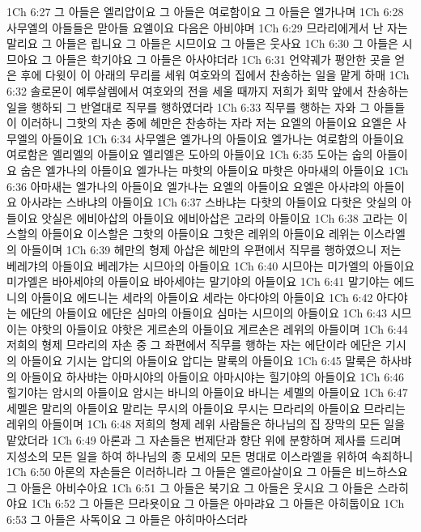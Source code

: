 1Ch 6:27  그 아들은 엘리압이요 그 아들은 여로함이요 그 아들은 엘가나며
1Ch 6:28  사무엘의 아들들은 맏아들 요엘이요 다음은 아비야며
1Ch 6:29  므라리에게서 난 자는 말리요 그 아들은 립니요 그 아들은 시므이요 그 아들은 웃사요
1Ch 6:30  그 아들은 시므아요 그 아들은 학기야요 그 아들은 아사야더라
1Ch 6:31  언약궤가 평안한 곳을 얻은 후에 다윗이 이 아래의 무리를 세워 여호와의 집에서 찬송하는 일을 맡게 하매
1Ch 6:32  솔로몬이 예루살렘에서 여호와의 전을 세울 때까지 저희가 회막 앞에서 찬송하는 일을 행하되 그 반열대로 직무를 행하였더라
1Ch 6:33  직무를 행하는 자와 그 아들들이 이러하니 그핫의 자손 중에 헤만은 찬송하는 자라 저는 요엘의 아들이요 요엘은 사무엘의 아들이요
1Ch 6:34  사무엘은 엘가나의 아들이요 엘가나는 여로함의 아들이요 여로함은 엘리엘의 아들이요 엘리엘은 도아의 아들이요
1Ch 6:35  도아는 숩의 아들이요 숩은 엘가나의 아들이요 엘가나는 마핫의 아들이요 마핫은 아마새의 아들이요
1Ch 6:36  아마새는 엘가나의 아들이요 엘가나는 요엘의 아들이요 요엘은 아사랴의 아들이요 아사랴는 스바냐의 아들이요
1Ch 6:37  스바냐는 다핫의 아들이요 다핫은 앗실의 아들이요 앗실은 에비아삽의 아들이요 에비아삽은 고라의 아들이요
1Ch 6:38  고라는 이스할의 아들이요 이스할은 그핫의 아들이요 그핫은 레위의 아들이요 레위는 이스라엘의 아들이며
1Ch 6:39  헤만의 형제 아삽은 헤만의 우편에서 직무를 행하였으니 저는 베레갸의 아들이요 베레갸는 시므아의 아들이요
1Ch 6:40  시므아는 미가엘의 아들이요 미가엘은 바아세야의 아들이요 바아세야는 말기야의 아들이요
1Ch 6:41  말기야는 에드니의 아들이요 에드니는 세라의 아들이요 세라는 아다야의 아들이요
1Ch 6:42  아다야는 에단의 아들이요 에단은 심마의 아들이요 심마는 시므이의 아들이요
1Ch 6:43  시므이는 야핫의 아들이요 야핫은 게르손의 아들이요 게르손은 레위의 아들이며
1Ch 6:44  저희의 형제 므라리의 자손 중 그 좌편에서 직무를 행하는 자는 에단이라 에단은 기시의 아들이요 기시는 압디의 아들이요 압디는 말룩의 아들이요
1Ch 6:45  말룩은 하사뱌의 아들이요 하사뱌는 아마시야의 아들이요 아마시야는 힐기야의 아들이요
1Ch 6:46  힐기야는 암시의 아들이요 암시는 바니의 아들이요 바니는 세멜의 아들이요
1Ch 6:47  세멜은 말리의 아들이요 말리는 무시의 아들이요 무시는 므라리의 아들이요 므라리는 레위의 아들이며
1Ch 6:48  저희의 형제 레위 사람들은 하나님의 집 장막의 모든 일을 맡았더라
1Ch 6:49  아론과 그 자손들은 번제단과 향단 위에 분향하며 제사를 드리며 지성소의 모든 일을 하여 하나님의 종 모세의 모든 명대로 이스라엘을 위하여 속죄하니
1Ch 6:50  아론의 자손들은 이러하니라 그 아들은 엘르아살이요 그 아들은 비느하스요 그 아들은 아비수아요
1Ch 6:51  그 아들은 북기요 그 아들은 웃시요 그 아들은 스라히야요
1Ch 6:52  그 아들은 므라욧이요 그 아들은 아마랴요 그 아들은 아히둡이요
1Ch 6:53  그 아들은 사독이요 그 아들은 아히마아스더라
